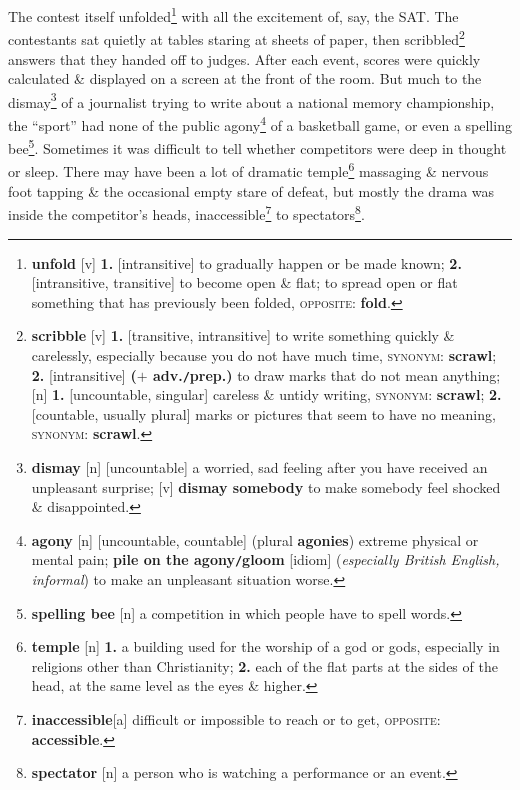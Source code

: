 \documentclass[oneside]{book}
\numberwithin{equation}{section}
\begin{document}
The contest itself unfolded\footnote{\textbf{unfold} [v] \textbf{1.} [intransitive] to gradually happen or be made known; \textbf{2.} [intransitive, transitive] to become open \& flat; to spread open or flat something that has previously been folded, \textsc{opposite}: \textbf{fold}.} with all the excitement of, say, the SAT. The contestants sat quietly at tables staring at sheets of paper, then scribbled\footnote{\textbf{scribble} [v] \textbf{1.} [transitive, intransitive] to write something quickly \& carelessly, especially because you do not have much time, \textsc{synonym}: \textbf{scrawl}; \textbf{2.} [intransitive] \textbf{($+$ adv.\texttt{/}prep.)} to draw marks that do not mean anything; [n] \textbf{1.} [uncountable, singular] careless \& untidy writing, \textsc{synonym}: \textbf{scrawl}; \textbf{2.} [countable, usually plural] marks or pictures that seem to have no meaning, \textsc{synonym}: \textbf{scrawl}.} answers that they handed off to judges. After each event, scores were quickly calculated \& displayed on a screen at the front of the room. But much to the dismay\footnote{\textbf{dismay} [n] [uncountable] a worried, sad feeling after you have received an unpleasant surprise; [v] \textbf{dismay somebody} to make somebody feel shocked \& disappointed.} of a journalist trying to write about a national memory championship, the ``sport'' had none of the public agony\footnote{\textbf{agony} [n] [uncountable, countable] (plural \textbf{agonies}) extreme physical or mental pain; \textbf{pile on the agony\texttt{/}gloom} [idiom] (\textit{especially British English, informal}) to make an unpleasant situation worse.} of a basketball game, or even a spelling bee\footnote{\textbf{spelling bee} [n] a competition in which people have to spell words.}. Sometimes it was difficult to tell whether competitors were deep in thought or sleep. There may have been a lot of dramatic temple\footnote{\textbf{temple} [n] \textbf{1.} a building used for the worship of a god or gods, especially in religions other than Christianity; \textbf{2.} each of the flat parts at the sides of the head, at the same level as the eyes \& higher.} massaging \& nervous foot tapping \& the occasional empty stare of defeat, but mostly the drama was inside the competitor's heads, inaccessible\footnote{\textbf{inaccessible}[a] difficult or impossible to reach or to get, \textsc{opposite}: \textbf{accessible}.} to spectators\footnote{\textbf{spectator} [n] a person who is watching a performance or an event.}.
\end{document}
